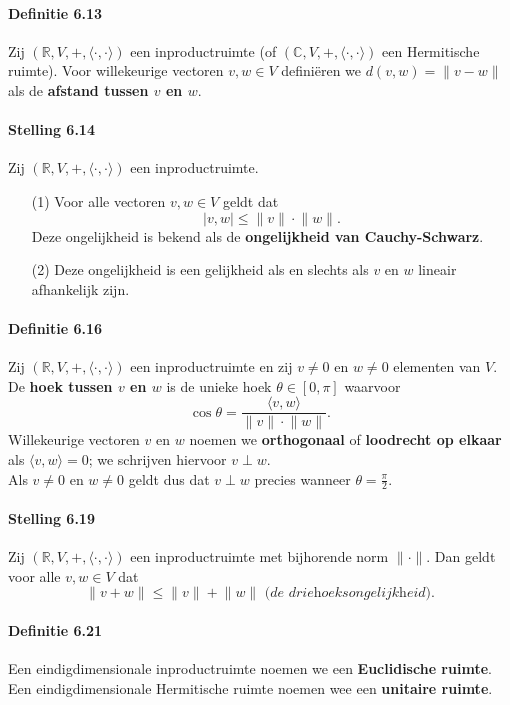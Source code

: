 \documentclass[11pt,oneside,a4paper]{article}
\begin{document}
	\paragraph{Definitie 6.13}
		Zij $(\mathbb{R},V,+, \langle \cdot , \cdot \rangle)$ een inproductruimte (of $(\mathbb{C},V,+, \langle \cdot , \cdot \rangle)$ een Hermitische ruimte). Voor willekeurige vectoren $v,w \in V$ definiëren we $d(v,w) = \lVert v-w \rVert$ als de \textbf{afstand tussen $v$ en $w$}.
	\paragraph{Stelling 6.14}
		Zij $(\mathbb{R},V,+, \langle \cdot , \cdot \rangle)$ een inproductruimte.
		\begin{itemize}
			\item[(1)] Voor alle vectoren $v,w \in V$ geldt dat $$\lvert v , w \rvert \le \lVert v \rVert \cdot \lVert w \rVert.$$ Deze ongelijkheid is bekend als de \textbf{ongelijkheid van Cauchy-Schwarz}.
			\item[(2)] Deze ongelijkheid is een gelijkheid als en slechts als $v$ en $w$ lineair afhankelijk zijn.
		\end{itemize}
	\paragraph{Definitie 6.16}
		Zij $(\mathbb{R},V,+, \langle \cdot , \cdot \rangle)$ een inproductruimte en zij $v \ne 0$ en $w \ne 0$ elementen van $V$. De \textbf{hoek tussen $v$ en $w$} is de unieke hoek $\theta \in [0, \pi]$ waarvoor $$\cos \theta = \frac{\langle v , w \rangle}{\lVert v \rVert \cdot \lVert w \rVert}.$$ Willekeurige vectoren $v$ en $w$ noemen we \textbf{orthogonaal} of \textbf{loodrecht op elkaar} als $\langle v , w \rangle = 0$; we schrijven hiervoor $v \perp w$. \\ Als $v \ne 0$ en $w \ne 0$ geldt dus dat $v \perp w$ precies wanneer $\theta = \frac{\pi}{2}$.
	\paragraph{Stelling 6.19}
		Zij $(\mathbb{R},V,+, \langle \cdot , \cdot \rangle)$ een inproductruimte met bijhorende norm $\lVert \cdot \rVert$. Dan geldt voor alle $v,w \in V$ dat $$\lVert v+w \rVert \le \lVert v \rVert + \lVert w \rVert \textit{ (de driehoeksongelijkheid).}$$
	\paragraph{Definitie 6.21}
		Een eindigdimensionale inproductruimte noemen we een \textbf{Euclidische ruimte}. Een eindigdimensionale Hermitische ruimte noemen wee een \textbf{unitaire ruimte}.
\end{document}
